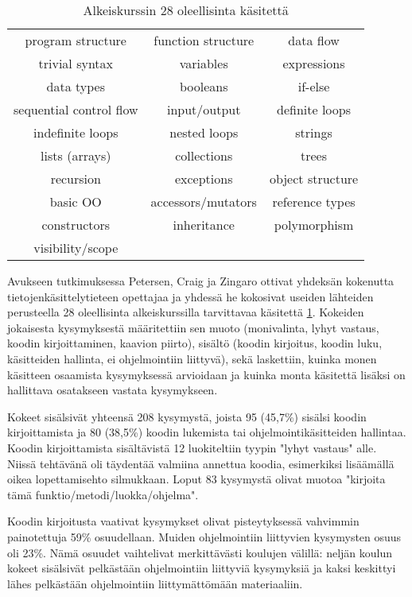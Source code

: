 \documentclass[finnish]{../tktltiki2}
\theoremstyle{definition}
\theoremstyle{remark}
\begin{document}
\begin{table}
  \begin{tabular}{ c c c }
    program structure & function structure & data flow \\
    trivial syntax & variables & expressions \\
    data types & booleans & if-else \\
    sequential control flow & input/output & definite loops \\
    indefinite loops & nested loops & strings \\
    lists (arrays) & collections & trees \\
    recursion & exceptions & object structure \\
    basic OO & accessors/mutators & reference types \\
    constructors & inheritance & polymorphism \\
    visibility/scope \\
  \end{tabular}
\caption{Alkeiskurssin 28 oleellisinta käsitettä}
\label{tab:kasitteet}
\end{table}

Avukseen tutkimuksessa Petersen, Craig ja Zingaro ottivat yhdeksän kokenutta tietojenkäsittelytieteen opettajaa ja yhdessä he kokosivat useiden lähteiden perusteella 28 oleellisinta alkeiskurssilla tarvittavaa käsitettä \ref{tab:kasitteet}. Kokeiden jokaisesta kysymyksestä määritettiin sen muoto (monivalinta, lyhyt vastaus, koodin kirjoittaminen, kaavion piirto), sisältö (koodin kirjoitus, koodin luku, käsitteiden hallinta, ei ohjelmointiin liittyvä), sekä laskettiin, kuinka monen käsitteen osaamista kysymyksessä arvioidaan ja kuinka monta käsitettä lisäksi on hallittava osatakseen vastata kysymykseen.

Kokeet sisälsivät yhteensä 208 kysymystä, joista 95 (45,7\%) sisälsi koodin kirjoittamista ja 80 (38,5\%) koodin lukemista tai ohjelmointikäsitteiden hallintaa. Koodin kirjoittamista sisältävistä 12 luokiteltiin tyypin "lyhyt vastaus" alle. Niissä tehtävänä oli täydentää valmiina annettua koodia, esimerkiksi lisäämällä oikea lopettamisehto silmukkaan. Loput 83 kysymystä olivat muotoa "kirjoita tämä funktio/metodi/luokka/ohjelma".

Koodin kirjoitusta vaativat kysymykset olivat pisteytyksessä vahvimmin painotettuja 59\% osuudellaan. Muiden ohjelmointiin liittyvien kysymysten osuus oli 23\%. Nämä osuudet vaihtelivat merkittävästi koulujen välillä: neljän koulun kokeet sisälsivät pelkästään ohjelmointiin liittyviä kysymyksiä ja kaksi keskittyi lähes pelkästään ohjelmointiin liittymättömään materiaaliin.
\end{document}
